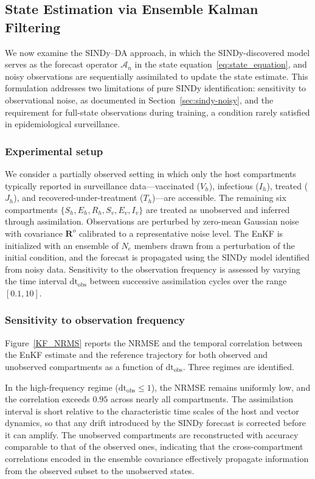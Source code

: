 \documentclass[9pt]{article}
\numberwithin{equation}{section}
\begin{document}
\subsection{State Estimation via Ensemble Kalman Filtering}\label{sec:enkf-results}
We now examine the SINDy--DA approach, in which the SINDy-discovered model serves as the forecast operator $\mathcal{A}_n$ in the state equation~\eqref{eq:state_equation}, and noisy observations are sequentially assimilated to update the state estimate. This formulation addresses two limitations of pure SINDy identification: sensitivity to observational noise, as documented in Section~\ref{sec:sindy-noisy}, and the requirement for full-state observations during training, a condition rarely satisfied in epidemiological surveillance.

\subsubsection{Experimental setup}\label{sec:enkf-setup}
We consider a partially observed setting in which only the host compartments typically reported in surveillance data---vaccinated ($V_h$), infectious ($I_h$), treated ($J_h$), and recovered-under-treatment ($T_h$)---are accessible. The remaining six compartments $\{S_h, E_h, R_h, S_v, E_v, I_v\}$ are treated as unobserved and inferred through assimilation. Observations are perturbed by zero-mean Gaussian noise with covariance $\mathbf{R}^o$ calibrated to a representative noise level. The EnKF is initialized with an ensemble of $N_e$ members drawn from a perturbation of the initial condition, and the forecast is propagated using the SINDy model identified from noisy data. Sensitivity to the observation frequency is assessed by varying the time interval $\mathrm{dt}_{\mathrm{obs}}$ between successive assimilation cycles over the range $[0.1, 10]$.

\subsubsection{Sensitivity to observation frequency}\label{sec:enkf-frequency}
Figure~\ref{KF_NRMS} reports the NRMSE and the temporal correlation between the EnKF estimate and the reference trajectory for both observed and unobserved compartments as a function of $\mathrm{dt}_{\mathrm{obs}}$. Three regimes are identified.

In the high-frequency regime ($\mathrm{dt}_{\mathrm{obs}} \leq 1$), the NRMSE remains uniformly low, and the correlation exceeds $0.95$ across nearly all compartments. The assimilation interval is short relative to the characteristic time scales of the host and vector dynamics, so that any drift introduced by the SINDy forecast is corrected before it can amplify. The unobserved compartments are reconstructed with accuracy comparable to that of the observed ones, indicating that the cross-compartment correlations encoded in the ensemble covariance effectively propagate information from the observed subset to the unobserved states.
\end{document}
